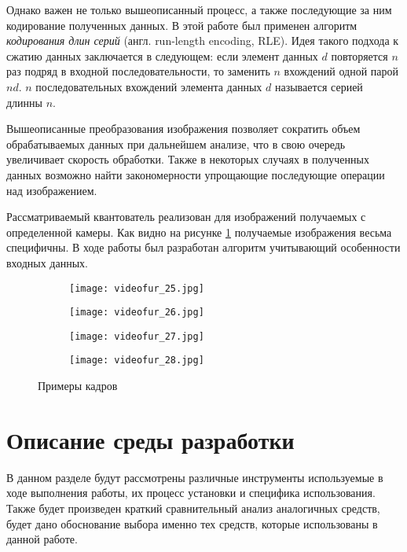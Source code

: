 Однако важен не только вышеописанный процесс, а также последующие за ним кодирование полученных данных. В этой работе был применен алгоритм \textit{кодирования длин серий} (англ. run-length encoding, RLE). Идея такого подхода к сжатию данных заключается в следующем: если элемент данных $d$ повторяется $n$ раз подряд в входной последовательности, то заменить $n$ вхождений одной парой $nd$. $n$ последовательных вхождений элемента данных $d$ называется серией длинны $n$. \cite[c.~22]{Salomon_2007}

Вышеописанные преобразования изображения позволяет сократить объем обрабатываемых данных при дальнейшем анализе, что в свою очередь увеличивает скорость обработки. Также в некоторых случаях в полученных данных возможно найти закономерности упрощающие последующие операции над изображением.
 
Рассматриваемый квантователь реализован  для изображений получаемых с определенной камеры. Как видно на рисунке \ref{fig:videofur1} получаемые изображения весьма специфичны. В ходе работы был разработан алгоритм учитывающий особенности входных данных. 
\begin{figure}[h]
    \centering
    \begin{subfigure}{\textwidth}
        \centering
        \texttt{[image: videofur\_25.jpg]}
        \caption{}
    \end{subfigure}    
    \begin{subfigure}{\textwidth}
        \centering
        \texttt{[image: videofur\_26.jpg]}
        \caption{}
    \end{subfigure} 
\begin{subfigure}{\textwidth}
    \centering
    \texttt{[image: videofur\_27.jpg]}
    \caption{}
\end{subfigure} 
\begin{subfigure}{\textwidth}
    \centering
    \texttt{[image: videofur\_28.jpg]}
    \caption{}
\end{subfigure} 
    \caption{Примеры кадров}
    \label{fig:videofur1}
\end{figure}

\section{Описание среды разработки}
\label{sec:env_description}
В данном разделе будут рассмотрены различные инструменты используемые в ходе выполнения работы, их процесс установки и специфика использования. Также будет произведен краткий сравнительный анализ аналогичных средств, будет дано обоснование выбора именно тех средств, которые использованы в данной работе. 
